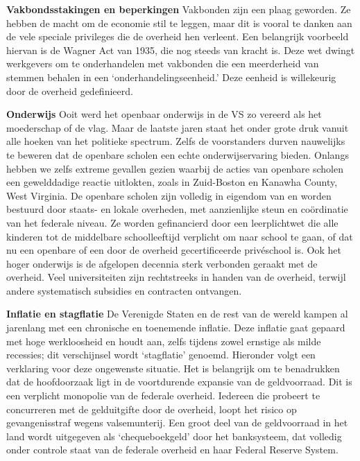 \documentclass[
  a5paper,
  smalldemyvopaper,10pt,twoside,onecolumn,openright,extrafontsizes,hidelinks]{memoir}
\begin{document}
\textbf{Vakbondsstakingen en beperkingen} Vakbonden zijn een plaag
geworden. Ze hebben de macht om de economie stil te leggen, maar dit is
vooral te danken aan de vele speciale privileges die de overheid hen
verleent. Een belangrijk voorbeeld hiervan is de Wagner Act van 1935,
die nog steeds van kracht is. Deze wet dwingt werkgevers om te
onderhandelen met vakbonden die een meerderheid van stemmen behalen in
een `onderhandelingseenheid.' Deze eenheid is willekeurig door de
overheid gedefinieerd.

\textbf{Onderwijs} Ooit werd het openbaar onderwijs in de VS zo vereerd
als het moederschap of de vlag. Maar de laatste jaren staat het onder
grote druk vanuit alle hoeken van het politieke spectrum. Zelfs de
voorstanders durven nauwelijks te beweren dat de openbare scholen een
echte onderwijservaring bieden. Onlangs hebben we zelfs extreme gevallen
gezien waarbij de acties van openbare scholen een gewelddadige reactie
uitlokten, zoals in Zuid-Boston en Kanawha County, West Virginia. De
openbare scholen zijn volledig in eigendom van en worden bestuurd door
staats- en lokale overheden, met aanzienlijke steun en coördinatie van
het federale niveau. Ze worden gefinancierd door een leerplichtwet die
alle kinderen tot de middelbare schoolleeftijd verplicht om naar school
te gaan, of dat nu een openbare of een door de overheid gecertificeerde
privéschool is. Ook het hoger onderwijs is de afgelopen decennia sterk
verbonden geraakt met de overheid. Veel universiteiten zijn rechtstreeks
in handen van de overheid, terwijl andere systematisch subsidies en
contracten ontvangen.

\textbf{Inflatie en stagflatie} De Verenigde Staten en de rest van de
wereld kampen al jarenlang met een chronische en toenemende inflatie.
Deze inflatie gaat gepaard met hoge werkloosheid en houdt aan, zelfs
tijdens zowel ernstige als milde recessies; dit verschijnsel wordt
`stagflatie' genoemd. Hieronder volgt een verklaring voor deze
ongewenste situatie. Het is belangrijk om te benadrukken dat de
hoofdoorzaak ligt in de voortdurende expansie van de geldvoorraad. Dit
is een verplicht monopolie van de federale overheid. Iedereen die
probeert te concurreren met de gelduitgifte door de overheid, loopt het
risico op gevangenisstraf wegens valsemunterij. Een groot deel van de
geldvoorraad in het land wordt uitgegeven als `chequeboekgeld' door het
banksysteem, dat volledig onder controle staat van de federale overheid
en haar Federal Reserve System.
\end{document}
